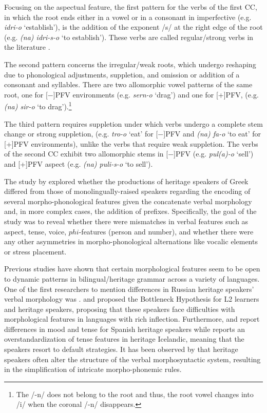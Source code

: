 \documentclass[output=paper,colorlinks,citecolor=brown]{langscibook}
\begin{document}
Focusing on the aspectual feature, the first pattern for the verbs of the first CC, in which the root ends either in a vowel or in a consonant in imperfective (e.g. \textit{idri-o} `establish'), is the addition of the exponent /s/ at the right edge of the root (e.g. \textit{(na) idri-s-o} `to establish'). These verbs are called regular/strong verbs in the literature \parencite{spyropoulos2017root, revithiadou2019changing}.

The second pattern concerns the irregular/weak roots, which undergo reshaping due to phonological adjustments, suppletion, and omission or addition of a consonant and syllables. There are two allomorphic vowel patterns of the same root, one for [−]PFV environments (e.g. \textit{sern-o} `drag') and one for [+]PFV, (e.g. \textit{(na) sir-o} `to drag').\footnote{The /-n/ does not belong to the root and thus, the root vowel changes into /i/ when the coronal /-n/ disappears.}

The third pattern requires suppletion under which verbs undergo a complete stem change or strong suppletion, (e.g. \textit{tro-o} `eat' for [−]PFV and \textit{(na) fa-o} `to eat' for [+]PFV environments), unlike the verbs that require weak suppletion.
The verbs of the second CC exhibit two allomorphic stems in
[−]PFV (e.g. \textit{pul(a)-o} `sell') and [+]PFV aspect (e.g. \textit{(na) puli-s-o} `to sell'). 

The study by \textcite{novelforms} explored whether the productions of heritage speakers of Greek differed from those of monolingually-raised speakers regarding the encoding of several morpho-phonological features given the concatenate verbal morphology and, in more complex cases, the addition of prefixes. Specifically, the goal of the study was to reveal whether there were mismatches in verbal features such as aspect, tense, voice, $phi$-features (person and number), and whether there were any other asymmetries in morpho-phonological alternations like vocalic elements or stress placement.
 
Previous studies have shown that certain morphological features seem to be open to dynamic patterns in bilingual/heritage grammar across a variety of languages. One of the first researchers to mention differences in Russian heritage speakers' verbal morphology was \textcite{romanova2008mechanisms}. \textcite{slabakova2014bottleneck} and \textcite{mikhaylova2018morphological} proposed the Bottleneck Hypothesis for L2 learners and heritage speakers, proposing that these speakers face difficulties with morphological features in languages with rich inflection. Furthermore, \textcite{perez2019differential} and \textcite{fernandez2021acquisition} report differences in mood and tense for Spanish heritage speakers while \textcite{johannsdottir2023and} reports an overstandardization of tense features in heritage Icelandic, meaning that the speakers resort to default strategies. It has been observed by \textcite{scontras2015heritage} that heritage speakers often alter the structure of the verbal morphosyntactic system, resulting in the simplification of intricate morpho-phonemic rules.
\end{document}
